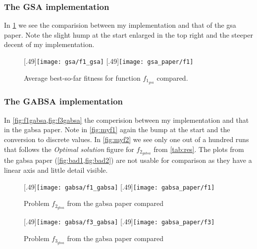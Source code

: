  
 
%
\clearpage
\subsubsection*{The GSA implementation}
In \cref{fig:f1} we see the comparision between my implementation and that of the \ac{gsa} paper. Note the slight hump at the start enlarged in the top right and the steeper decent of my implementation.
%
\begin{figure}[h]
	\centering
		[.49\linewidth]{\texttt{[image: gsa/f1\_gsa]}}
		[.49\linewidth]{\texttt{[image: gsa\_paper/f1]}}
	\caption{Average best-so-far fitness for function $f_{1_{gsa}}$ compared.}
    \label{fig:f1}
\end{figure}
%
\subsubsection*{The GABSA implementation}
In \cref{fig:f1gabsa,fig:f3gabsa} the comperision between my implementation and that in the \ac{gabsa} paper. Note in \cref{fig:myf1} again the bump at the start and the conversion to discrete values. In \cref{fig:myf2} we see only one out of a hundred runs that follows the \textit{Optimal solution} figure for $f_{2_{gabsa}}$ from \cref{tab:res}. The plots from the \ac{gabsa} paper (\cref{fig:bad1,fig:bad2}) are not usable for comparison as they have a linear axis and little detail visible.
%

\begin{figure}[h]
	\centering
		[.49\linewidth]{\texttt{[image: gabsa/f1\_gabsa]}}
		[.49\linewidth]{\texttt{[image: gabsa\_paper/f1]}}
	\caption{Problem $f_{2_{gbsa}}$ from the \ac{gabsa} paper\cite{GABSA} compared}
    \label{fig:f1gabsa}
\end{figure}
%
\begin{figure}[h]
	\centering
		[.49\linewidth]{\texttt{[image: gabsa/f3\_gabsa]}}
		[.49\linewidth]{\texttt{[image: gabsa\_paper/f3]}}
	\caption{Problem $f_{3_{gbsa}}$ from the \ac{gabsa} paper\cite{GABSA} compared}
    \label{fig:f3gabsa}
\end{figure}
%
\clearpage
